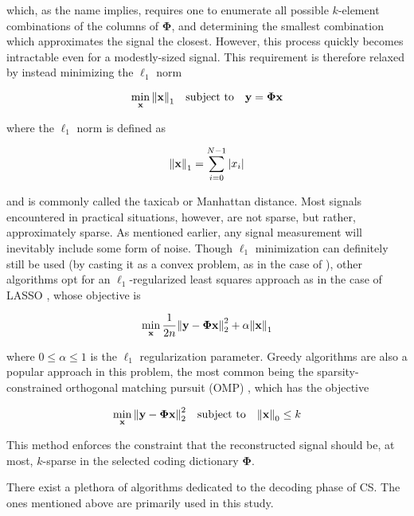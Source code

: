 \noindent which, as the name implies, requires one to enumerate all possible $k$-element combinations of the columns of $\bm\Phi$, and determining the smallest combination which approximates the signal the closest. However, this process quickly becomes intractable even for a modestly-sized signal. This requirement is therefore relaxed by instead minimizing the $\ell_1$ norm

\begin{equation}\label{eq:min-l1}
	\min_{\text{\bfseries x}} \norm{\text{\bfseries x}}_1 \quad \textrm{subject to} \quad \text{\bfseries y} = \bm\Phi \text{\bfseries x}
\end{equation}

\noindent where the $\ell_1$ norm is defined as

\begin{equation}\label{eq:l1-norm}
	\norm{\text{\bfseries x}}_1 = \sum_{i=0}^{N-1} \abs{x_i}
\end{equation}

\noindent and is commonly called the taxicab or Manhattan distance. Most signals encountered in practical situations, however, are not sparse, but rather, approximately sparse. As mentioned earlier, any signal measurement will inevitably include some form of noise. Though $\ell_1$ minimization can definitely still be used (by casting it as a convex problem, as in the case of \cite{cvxpy,cvxpy_rewriting}), other algorithms opt for an $\ell_1$-regularized least squares approach as in the case of LASSO \cite{scikit-learn}, whose objective is

\begin{equation}\label{eq:lasso}
	\min_{\text{\bfseries x}} \frac{1}{2n} \norm{\text{\bfseries y} - \bm\Phi\text{\bfseries x}}_2^2 + \alpha\norm{\text{\bfseries x}}_1
\end{equation}

\noindent where $0 \leq \alpha \leq 1$ is the $\ell_1$ regularization parameter. Greedy algorithms are also a popular approach in this problem, the most common being the sparsity-constrained orthogonal matching pursuit (OMP) \cite{Rubinstein2008}, which has the objective

\begin{equation}
	\min_{\text{\bfseries x}} \norm{\text{\bfseries y} - \bm\Phi \text{\bfseries x}}_2^2 \quad \textrm{subject to} \quad \norm{\text{\bfseries x}}_0 \leq k
\end{equation}

\noindent This method enforces the constraint that the reconstructed signal should be, at most, $k$-sparse in the selected coding dictionary $\bm\Phi$.

There exist a plethora of algorithms dedicated to the decoding phase of CS. The ones mentioned above are primarily used in this study.